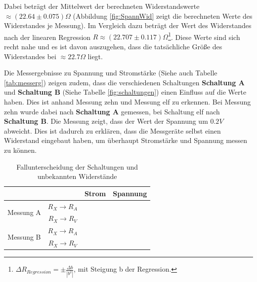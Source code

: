 \documentclass[10pt,a4paper]{article}
\newcommand{\cmark}{\ding{51}}%
\newcommand{\xmark}{\ding{55}}%
\begin{document}

\begin{flushleft}
Dabei beträgt der Mittelwert der berechneten Widerstandswerte $\approx (22.64 \pm 0.075) \Omega$ (Abbildung \ref{fig:SpannWid} zeigt die berechneten Werte des Widerstandes je Messung). Im Vergleich dazu beträgt der Wert des Widerstandes nach der linearen Regression $R \approx (22.707 \pm 0.117)\Omega$\footnote{$\Delta R_{Regression} = \pm \frac{\Delta b}{|b^2|}$, mit Steigung b der Regression.}. Diese Werte sind sich recht nahe und es ist davon auszugehen, dass die tatsächliche Größe des Widerstandes bei $\approx 22.7 \Omega$ liegt.

Die Messergebnisse zu Spannung und Stromstärke (Siehe auch Tabelle \ref{tab:messerg}) zeigen zudem, dass die verschiedenen Schaltungen \textbf{Schaltung A} und \textbf{Schaltung B} (Siehe Tabelle \ref{fig:schaltungen}) einen Einfluss auf die Werte haben. Dies ist anhand Messung zehn und Messung elf zu erkennen. Bei Messung zehn wurde dabei nach \textbf{Schaltung A} gemessen, bei Schaltung elf nach \textbf{Schaltung B}. Die Messung zeigt, dass der Wert der Spannung um $0.2V$ abweicht. Dies ist dadurch zu erklären, dass die Messgeräte selbst einen Widerstand eingebaut haben, um überhaupt Stromstärke und Spannung messen zu können.
\end{flushleft}

\begin{table}[h]
\centering
\caption[Fallunterscheidung]{Fallunterscheidung der Schaltungen und unbekannten Widerstände\footnotemark}
\label{tab:Fallunterscheidung}
\begin{tabular}{|c|c|c|c|}
\hline
& & Strom & Spannung \\
\hline
\multirow{2}{*}{Messung A} & $R_X \to R_A$ & \cmark & \cmark  \\
\cline{2-4}
& $R_X \to R_V$ & \xmark & \cmark \\
\hline
\multirow{2}{*}{Messung B} & $R_X \to R_A$ & \cmark & \xmark \\
\cline{2-4}
& $R_X \to R_V$ & \cmark & \cmark \\
\hline
\end{tabular}
\end{table}
\end{document}
